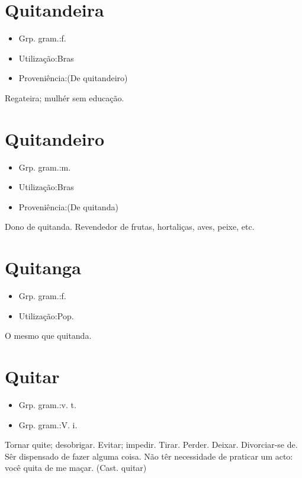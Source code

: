 \section{Quitandeira}
\begin{itemize}
\item {Grp. gram.:f.}
\end{itemize}
\begin{itemize}
\item {Utilização:Bras}
\end{itemize}
\begin{itemize}
\item {Proveniência:(De \textunderscore quitandeiro\textunderscore )}
\end{itemize}
Regateira; mulhér sem educação.
\section{Quitandeiro}
\begin{itemize}
\item {Grp. gram.:m.}
\end{itemize}
\begin{itemize}
\item {Utilização:Bras}
\end{itemize}
\begin{itemize}
\item {Proveniência:(De \textunderscore quitanda\textunderscore )}
\end{itemize}
Dono de quitanda.
Revendedor de frutas, hortaliças, aves, peixe, etc.
\section{Quitanga}
\begin{itemize}
\item {Grp. gram.:f.}
\end{itemize}
\begin{itemize}
\item {Utilização:Pop.}
\end{itemize}
O mesmo que \textunderscore quitanda\textunderscore .
\section{Quitar}
\begin{itemize}
\item {Grp. gram.:v. t.}
\end{itemize}
\begin{itemize}
\item {Grp. gram.:V. i.}
\end{itemize}
Tornar quite; desobrigar.
Evitar; impedir.
Tirar.
Perder.
Deixar.
Divorciar-se de.
Sêr dispensado de fazer alguma coisa.
Não têr necessidade de praticar um acto: \textunderscore você quita de me maçar\textunderscore .
(Cast. \textunderscore quitar\textunderscore )
